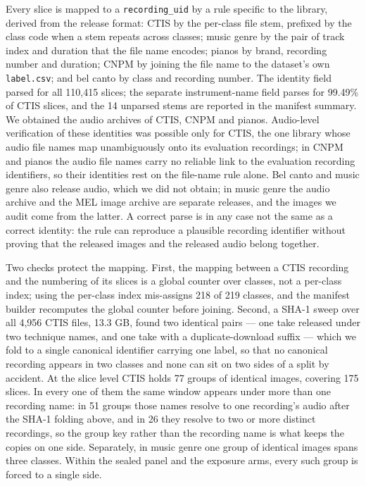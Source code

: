 Every slice is mapped to a \texttt{recording\_uid} by a rule specific to the library, derived
from the release format: CTIS by the
per-class file stem, prefixed by the class code when a stem repeats across classes;
music genre by the pair of track index and duration that the file name encodes; pianos by brand,
recording number and duration; CNPM by joining the file name to the dataset's own
\texttt{label.csv}; and bel canto by class and recording number. The identity field parsed for
all 110{,}415 slices; the separate instrument-name field parses
for 99.49\% of CTIS slices, and the 14 unparsed stems are reported in the manifest summary.
We obtained the audio archives of CTIS, CNPM and pianos. Audio-level verification of these
identities was possible only for CTIS, the one library whose audio file names map unambiguously
onto its evaluation recordings; in CNPM and pianos the audio file names carry no reliable link
to the evaluation recording identifiers, so their identities rest on the file-name rule alone.
Bel canto and music genre also release audio, which we did not obtain; in music genre the audio
archive and the MEL image archive are separate releases, and the images we audit come from the
latter. A correct parse is in any case not the same as a correct identity: the rule can
reproduce a plausible recording identifier without proving that the released images and the
released audio belong together.

Two checks protect the mapping. First, the mapping between a CTIS recording and the numbering of
its slices is a global counter over classes, not a per-class index; using the per-class index
mis-assigns 218 of 219 classes, and the manifest builder recomputes the global counter before
joining. Second, a SHA-1 sweep over all 4{,}956 CTIS files, 13.3 GB, found two identical pairs --- one take
released under two technique names, and one take with a duplicate-download suffix ---
which we fold to a single canonical identifier carrying one label, so that no canonical
recording appears in two classes and none can sit on two sides of a split by accident. At the slice level CTIS holds 77 groups of identical images,
covering 175 slices. In every one of them the same window appears under more than one recording
name: in 51 groups those names resolve to one recording's audio after the SHA-1 folding above, and
in 26 they resolve to two or more distinct recordings, so the group key rather than the recording
name is what keeps the copies on one side. Separately, in music genre one group of identical
images spans three classes. Within the sealed panel and the exposure arms, every such group is
forced to a single side.

